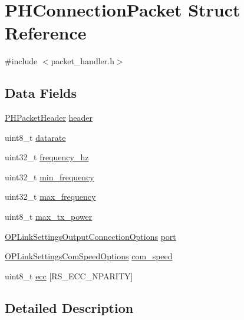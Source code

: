 \hypertarget{struct_p_h_connection_packet}{\section{\-P\-H\-Connection\-Packet \-Struct \-Reference}
\label{struct_p_h_connection_packet}
}


{\ttfamily \#include $<$packet\-\_\-handler.\-h$>$}

\subsection*{\-Data \-Fields}
\begin{DoxyCompactItemize}
\item 
\hyperlink{struct_p_h_packet_header}{\-P\-H\-Packet\-Header} \hyperlink{struct_p_h_connection_packet_a52261a934b08802064ddd177d22f5a1b}{header}
\item 
uint8\-\_\-t \hyperlink{struct_p_h_connection_packet_ac0efb46843892dc7b42a503eeea6d58c}{datarate}
\item 
uint32\-\_\-t \hyperlink{struct_p_h_connection_packet_a50a68f68b6f7f8d07f91f9076d638dbd}{frequency\-\_\-hz}
\item 
uint32\-\_\-t \hyperlink{struct_p_h_connection_packet_a4e11c88e3be1dbcacc324aace217b7e6}{min\-\_\-frequency}
\item 
uint32\-\_\-t \hyperlink{struct_p_h_connection_packet_a607b2aff285e735c41dee293f8144be0}{max\-\_\-frequency}
\item 
uint8\-\_\-t \hyperlink{struct_p_h_connection_packet_aaeff460e39a62242df16ffce090b0760}{max\-\_\-tx\-\_\-power}
\item 
\hyperlink{group___o_p_link_settings_ga1511abaff051d1cd559ddd52fea0bfa8}{\-O\-P\-Link\-Settings\-Output\-Connection\-Options} \hyperlink{struct_p_h_connection_packet_ae3b874c83f519f62b7ee56a805c527d5}{port}
\item 
\hyperlink{group___o_p_link_settings_gaf4886a2c0a8f8a79c93d27c94ee503ba}{\-O\-P\-Link\-Settings\-Com\-Speed\-Options} \hyperlink{struct_p_h_connection_packet_aba21090aa4d393dc1d6e85406efa1c4b}{com\-\_\-speed}
\item 
uint8\-\_\-t \hyperlink{struct_p_h_connection_packet_a047b7d5ea9d5699d06966d96ef4ccfba}{ecc} \mbox{[}\-R\-S\-\_\-\-E\-C\-C\-\_\-\-N\-P\-A\-R\-I\-T\-Y\mbox{]}
\end{DoxyCompactItemize}


\subsection{\-Detailed \-Description}


